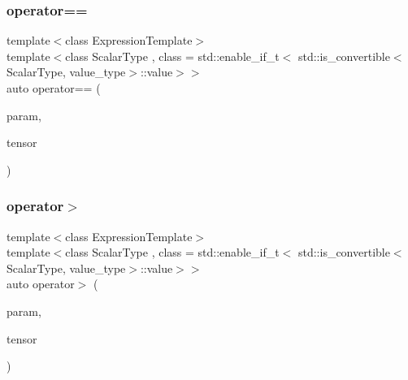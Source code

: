 \mbox{\label{classbc_1_1tensors_1_1Expression__Base_a40bd65b31a908496df2f3be539ca4dc0}} 
\subsubsection{\texorpdfstring{operator==}{operator==}}
{\footnotesize\ttfamily template$<$class Expression\+Template$>$ \\
template$<$class Scalar\+Type , class  = std\+::enable\+\_\+if\+\_\+t$<$   std\+::is\+\_\+convertible$<$\+Scalar\+Type, value\+\_\+type$>$\+::value$>$$>$ \\
auto operator== (\begin{DoxyParamCaption}\item[{const Scalar\+Type \&}]{param,  }\item[{const \hyperlink{classbc_1_1tensors_1_1Expression__Base}{Expression\+\_\+\+Base}$<$ Expression\+Template $>$ \&}]{tensor }\end{DoxyParamCaption})\hspace{0.3cm}{\ttfamily [friend]}}

\mbox{\label{classbc_1_1tensors_1_1Expression__Base_a423aa9cadcd7aced726017de5d273830}} 
\subsubsection{\texorpdfstring{operator$>$}{operator>}}
{\footnotesize\ttfamily template$<$class Expression\+Template$>$ \\
template$<$class Scalar\+Type , class  = std\+::enable\+\_\+if\+\_\+t$<$   std\+::is\+\_\+convertible$<$\+Scalar\+Type, value\+\_\+type$>$\+::value$>$$>$ \\
auto operator$>$ (\begin{DoxyParamCaption}\item[{const Scalar\+Type \&}]{param,  }\item[{const \hyperlink{classbc_1_1tensors_1_1Expression__Base}{Expression\+\_\+\+Base}$<$ Expression\+Template $>$ \&}]{tensor }\end{DoxyParamCaption})\hspace{0.3cm}{\ttfamily [friend]}}

